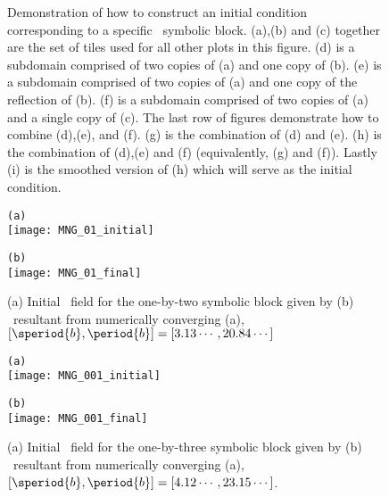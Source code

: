 \begin{description}
{\begin{figure}
\caption{ \label{fig:tilingschematic}
Demonstration of how to construct an initial condition corresponding to a specific
\spt\ symbolic block. (a),(b) and (c) together are the set of tiles used for all
other plots in this figure. (d) is a subdomain comprised of two copies of (a) and one copy of (b). (e) is a subdomain comprised of two copies of (a) and one copy of
the reflection of (b). (f) is a subdomain comprised of two copies of (a) and a
single copy of (c). The last row of figures demonstrate how to combine (d),(e),
and (f). (g) is the combination of (d) and (e). (h) is the combination of (d),(e)
and (f) (equivalently, (g) and (f)). Lastly (i) is the smoothed version of (h) which will serve as the initial condition.
}
\end{figure}


\begin{figure}
\begin{minipage}[height=.4\textheight]{.5\textwidth}
\centering \small{\texttt{(a)}}\\
\texttt{[image: MNG\_01\_initial]}
\end{minipage}
\begin{minipage}[height=.4\textheight]{.5\textwidth}
\centering \small{\texttt{(b)}}\\
\texttt{[image: MNG\_01\_final]}
\end{minipage}
\caption{ \label{fig:block01}
(a) Initial \spt\ field for the one-by-two symbolic block given by 
(b) \twoT\ resultant from numerically converging (a),
$[\speriod{b},\period{b}]=[3.13\cdots,20.84\cdots]$
}
\end{figure}

\begin{figure}
\begin{minipage}[height=.4\textheight]{.5\textwidth}
\centering \small{\texttt{(a)}}\\
\texttt{[image: MNG\_001\_initial]}
\end{minipage}
\begin{minipage}[height=.4\textheight]{.5\textwidth}
\centering \small{\texttt{(b)}}\\
\texttt{[image: MNG\_001\_final]}
\end{minipage}
\caption{ \label{fig:block001}
(a) Initial \spt\ field for the one-by-three symbolic block given by 
(b) \twoT\ resultant from numerically converging (a),
$[\speriod{b},\period{b}]=[4.12\cdots,23.15\cdots ]$.
}
\end{figure}




}
\end{description}
